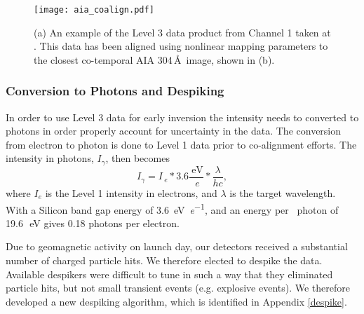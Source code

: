   \begin{figure}[htb!]
	\centering
	\texttt{[image: aia\_coalign.pdf]}
	\caption{(a) An example of the Level 3 data product from Channel 1 taken at \levthreetime. This data has been aligned using nonlinear mapping parameters to the closest co-temporal AIA 304\,\AA\ image, shown in (b). }
	\label{fig:coalign}
\end{figure}
    	
    
\subsubsection{Conversion to Photons and Despiking}
In order to use Level 3 data for early inversion the intensity needs to  converted to photons in order properly account for uncertainty in the data.
The conversion from electron to photon is done to Level 1 data prior to co-alignment efforts.
The intensity in photons, $I_{\gamma}$, then becomes
\begin{equation}
   I_{\gamma} = I_{\SI{}{\elementarycharge}} * 3.6 \frac{\SI{}{\electronvolt}}{\SI{}{\elementarycharge}} * \frac{\lambda}{hc},
\end{equation}
where $I_e$ is the Level 1 intensity in electrons, and $\lambda$ is the target wavelength.
With a Silicon band gap energy of \SI[per-mode=symbol]{3.6}{\electronvolt\per\elementarycharge}, and an energy per \ov \ photon 
of 19.6\,\SI{}{\electronvolt} gives 0.18 photons per electron.

Due to geomagnetic activity on launch day, our detectors received a substantial number of charged particle hits. We therefore elected to despike the data.
Available despikers were difficult to tune in such a way that they eliminated particle hits, but not small transient events (e.g. explosive events). We therefore developed a new despiking algorithm, which is identified in Appendix \ref{despike}.






